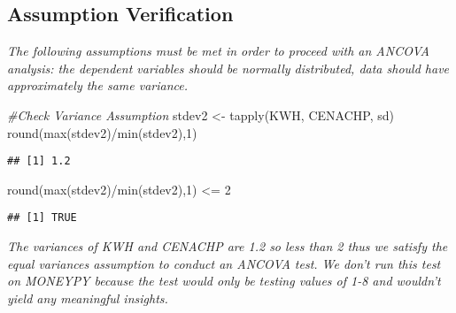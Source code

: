 \documentclass[
]{article}
\newenvironment{Shaded}{\begin{snugshade}}{\end{snugshade}}
\newcommand{\AttributeTok}[1]{\textcolor[rgb]{0.77,0.63,0.00}{#1}}
\newcommand{\CommentTok}[1]{\textcolor[rgb]{0.56,0.35,0.01}{\textit{#1}}}
\newcommand{\ConstantTok}[1]{\textcolor[rgb]{0.00,0.00,0.00}{#1}}
\newcommand{\DecValTok}[1]{\textcolor[rgb]{0.00,0.00,0.81}{#1}}
\newcommand{\FunctionTok}[1]{\textcolor[rgb]{0.00,0.00,0.00}{#1}}
\newcommand{\NormalTok}[1]{#1}
\newcommand{\OtherTok}[1]{\textcolor[rgb]{0.56,0.35,0.01}{#1}}
\newcommand{\SpecialCharTok}[1]{\textcolor[rgb]{0.00,0.00,0.00}{#1}}
\begin{document}
\hypertarget{assumption-verification}{%
\subsection{Assumption Verification}\label{assumption-verification}}

\emph{The following assumptions must be met in order to proceed with an
ANCOVA analysis: the dependent variables should be normally distributed,
data should have approximately the same variance.}

\begin{Shaded}
\begin{Highlighting}[]
\CommentTok{\#Check Variance Assumption}
\NormalTok{stdev2 }\OtherTok{\textless{}{-}} \FunctionTok{tapply}\NormalTok{(KWH, CENACHP, sd)}
\FunctionTok{round}\NormalTok{(}\FunctionTok{max}\NormalTok{(stdev2)}\SpecialCharTok{/}\FunctionTok{min}\NormalTok{(stdev2),}\DecValTok{1}\NormalTok{)}
\end{Highlighting}
\end{Shaded}

\begin{verbatim}
## [1] 1.2
\end{verbatim}

\begin{Shaded}
\begin{Highlighting}[]
\FunctionTok{round}\NormalTok{(}\FunctionTok{max}\NormalTok{(stdev2)}\SpecialCharTok{/}\FunctionTok{min}\NormalTok{(stdev2),}\DecValTok{1}\NormalTok{) }\SpecialCharTok{\textless{}=} \DecValTok{2}
\end{Highlighting}
\end{Shaded}

\begin{verbatim}
## [1] TRUE
\end{verbatim}

\emph{The variances of KWH and CENACHP are 1.2 so less than 2 thus we
satisfy the equal variances assumption to conduct an ANCOVA test. We
don't run this test on MONEYPY because the test would only be testing
values of 1-8 and wouldn't yield any meaningful insights.}

\begin{Shaded}
\end{Shaded}
\end{document}
